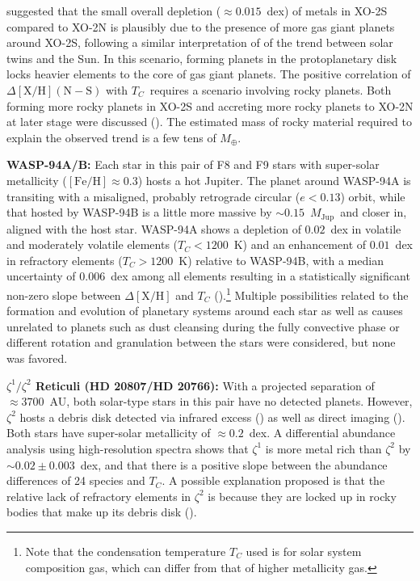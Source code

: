 \documentclass[modern, letterpaper]{aastex61}
\newcommand*\elem[1]{\ensuremath{\mathrm{#1}}}
\newcommand*\elemH[1]{\ensuremath{[\mathrm{#1}/\elem{H}]}}
\newcommand*{\feh}{\ensuremath{\elemH{Fe}}}
\newcommand{\Tcondens}{\ensuremath{T_C}}
\newcommand{\mearth}{\ensuremath{M_\oplus}}
\newcommand{\mjupiter}{\ensuremath{M_\mathrm{Jup}}}
\begin{document}
\citealt{Ramirez:2015aa} suggested that the small overall depletion
($\approx 0.015$~dex) of metals in
XO-2S compared to XO-2N is plausibly due to the presence of more gas
giant planets around XO-2S, following a similar interpretation of
\citealt{Melendez:2009aa} of the trend between solar twins and the Sun.
In this scenario, forming planets in the protoplanetary disk
locks heavier elements to the core of gas giant planets.
The positive correlation of $\Delta\elemH{X} (\mathrm{N}-\mathrm{S})$
with \Tcondens\ requires a scenario involving rocky planets.
Both forming more rocky planets in XO-2S and accreting more rocky planets to
XO-2N at later stage were discussed (\citealt{Ramirez:2015aa,Biazzo:2015aa}).
The estimated mass of rocky material required to explain the observed trend
is a few tens of $\mearth$.

{\bf WASP-94A/B:}
Each star in this pair of F8 and F9 stars with super-solar metallicity
($\feh\approx 0.3$) hosts a hot Jupiter.
The planet around WASP-94A is transiting with a misaligned, probably retrograde
circular ($e<0.13$) orbit, while that hosted by WASP-94B is a little more
massive by $\sim 0.15$~\mjupiter\ and closer in, aligned with the host star.
WASP-94A shows a depletion of $0.02$~dex in volatile and moderately volatile
elements ($\Tcondens < 1200$~K) and an enhancement of $0.01$~dex in refractory
elements ($\Tcondens>1200$~K) relative to WASP-94B, with a median
uncertainty of $0.006$~dex among all elements
resulting in a statistically significant non-zero slope between
$\Delta\elemH{X}$ and $\Tcondens$ (\citealt{Teske:2016aa}).\footnote{
  Note that the condensation
  temperature $\Tcondens$ used is for solar system composition
  gas, which can differ from that of higher metallicity gas.}
Multiple possibilities related to the formation and evolution
of planetary systems around each star as well as causes unrelated to planets
such as dust cleansing during the fully convective phase or different rotation
and granulation between the stars were considered, but none was favored.

{\bf $\zeta^1/\zeta^2$ Reticuli (HD 20807/HD 20766):}
With a projected separation of $\approx 3700$~AU, both solar-type stars in this pair have
no detected planets.
However, $\zeta^2$ hosts a debris disk detected via infrared excess
(\citealt{2008ApJ...674.1086T}) as well as direct imaging
(\citealt{2010A&A...518L.131E}).
Both stars have super-solar metallicity of $\approx 0.2$~dex.
A differential abundance analysis using high-resolution spectra
shows that $\zeta^1$ is more metal rich than $\zeta^2$ by $\sim 0.02 \pm 0.003$~dex,
and that there is a positive slope between the abundance differences of 24 species
and $\Tcondens$.
A possible explanation proposed is that the relative lack of refractory elements
in $\zeta^2$ is because they are locked up in rocky bodies
that make up its debris disk (\citealt{2016A&A...588A..81S}).
\end{document}
